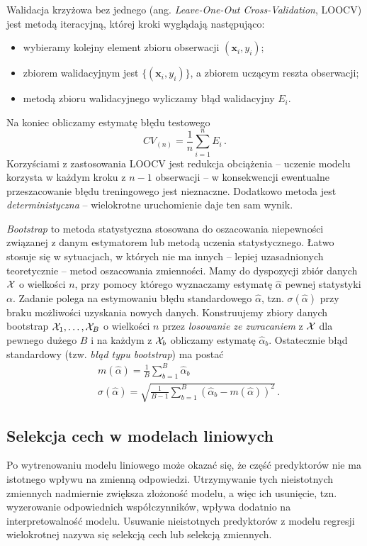 \documentclass{myclass}
\begin{document}
Walidacja krzyżowa bez jednego (ang. \emph{Leave-One-Out Cross-Validation}, LOOCV) jest metodą
iteracyjną, której kroki wyglądają następująco: 
\begin{itemize}
\item wybieramy kolejny element zbioru obserwacji \((\bm{x}_i, y_i)\);
\item zbiorem walidacyjnym jest \(\{(\bm{x}_i, y_i)\}\), a zbiorem uczącym reszta obserwacji;
\item metodą zbioru walidacyjnego wyliczamy błąd walidacyjny \(E_i\).
\end{itemize}
Na koniec obliczamy estymatę błędu testowego
\[
CV_{(n)} = \frac{1}{n}\sum_{i=1}^n E_i\,.
\]
Korzyściami z zastosowania LOOCV jest redukcja obciążenia -- uczenie modelu korzysta w każdym kroku
z \(n-1\) obserwacji -- w konsekwencji ewentualne przeszacowanie błędu treningowego jest nieznaczne.
Dodatkowo metoda jest \emph{deterministyczna} -- wielokrotne uruchomienie daje ten sam wynik.

\emph{Bootstrap} to metoda statystyczna stosowana do oszacowania niepewności związanej z danym
estymatorem lub metodą uczenia statystycznego. Łatwo stosuje się w sytuacjach, w których nie ma
innych -- lepiej uzasadnionych teoretycznie -- metod oszacowania zmienności. Mamy do dyspozycji
zbiór danych \(\mathcal{X}\) o wielkości \(n\), przy pomocy którego wyznaczamy estymatę \(\hat{\alpha}\)
pewnej statystyki \(\alpha\). Zadanie polega na estymowaniu błędu standardowego \(\hat{\alpha}\),
tzn. \(\sigma(\hat{\alpha})\) przy braku możliwości uzyskania nowych danych. Konstruujemy zbiory
danych bootstrap \(\mathcal{X}_1,\ldots,\mathcal{X}_B\) o wielkości \(n\) przez \emph{losowanie ze zwracaniem}
z \(\mathcal{X}\) dla pewnego dużego \(B\) i na każdym z \(\mathcal{X}_b\) obliczamy estymatę
\(\hat{\alpha}_b\). Ostatecznie błąd standardowy (tzw. \emph{błąd typu bootstrap}) ma postać
\[
\begin{split}
    &m(\hat{\alpha}) = \frac{1}{B} \sum_{b=1}^B \hat{\alpha}_b \\
    &\sigma(\hat{\alpha}) = \sqrt{\frac{1}{B-1} \sum_{b=1}^B \left(\hat{\alpha}_b - m(\hat{\alpha})\right)^2}\,.
\end{split}
\]


\subsection{Selekcja cech w modelach liniowych}

Po wytrenowaniu modelu liniowego może okazać się, że część predyktorów nie ma istotnego wpływu na
zmienną odpowiedzi. Utrzymywanie tych nieistotnych zmiennych nadmiernie zwiększa złożoność modelu, a
więc ich usunięcie, tzn. wyzerowanie odpowiednich współczynników, wpływa dodatnio na
interpretowalność modelu. Usuwanie nieistotnych predyktorów z modelu regresji wielokrotnej nazywa
się selekcją cech lub selekcją zmiennych.
\end{document}
